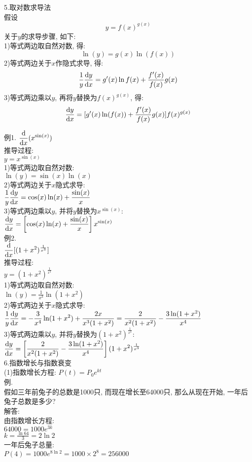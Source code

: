 5.取对数求导法\\
假设
\[y=f(x)^{g(x)}\]
关于$y$的求导步骤, 如下:\\
1)等式两边取自然对数, 得:
\[\ln(y)=g(x)\ln(f(x))\]
2)等式两边关于$x$作隐式求导, 得:
\[\frac{1}{y}\frac{\mathop{}\!\mathrm{d} y}{\mathop{}\!\mathrm{d} x}=g'(x)\ln f(x)+\frac{f'(x)}{f(x)}g(x)\]
3)等式两边乘以$y$, 再将$y$替换为$f(x)^{g(x)}$, 得:
\[\frac{\mathop{}\!\mathrm{d} y}{\mathop{}\!\mathrm{d} x}=[g'(x)\ln(f(x))+\frac{f'(x)}{f(x)}g(x)]f(x)^{g(x)}\]

例1.
\phantom{例}$\displaystyle\frac{\mathop{}\!\mathrm{d}}{\mathop{}\!\mathrm{d} x}(x^{\sin(x)})$\\
推导过程:\\
$\displaystyle y=x^{\sin(x)}$\\
1)等式两边取自然对数:\\
\phantom{\qquad}$\displaystyle\ln(y)=\sin(x)\ln(x)$\\
2)等式两边关于$x$隐式求导:\\
\phantom{\qquad}$\displaystyle\frac{1}{y}\frac{\mathop{}\!\mathrm{d} y}{\mathop{}\!\mathrm{d} x}=\cos(x)\ln(x)+\frac{\sin(x)}{x}$\\
3)等式两边乘以$y$, 并将$y$替换为$x^{\sin(x)}$:\\
\phantom{\qquad}$\displaystyle\frac{\mathop{}\!\mathrm{d} y}{\mathop{}\!\mathrm{d} x}=\left[\cos(x)\ln(x)+\frac{\sin(x)}{x}\right]x^{\sin(x)}$\\[1ex]

例2.\\
\phantom{例}$\displaystyle\frac{\mathop{}\!\mathrm{d}}{\mathop{}\!\mathrm{d} x}[(1+x^2)^{\frac{1}{x^3}}]$\\
推导过程:\\
$\displaystyle y=(1+x^2)^{\frac{1}{x^3}}$\\
1)等式两边取自然对数:\\
\phantom{\qquad}$\displaystyle\ln(y)=\frac{1}{x^3}\ln(1+x^2)$\\
2)等式两边关于$x$隐式求导:\\
\phantom{\qquad}$\displaystyle\frac{1}{y}\frac{\mathop{}\!\mathrm{d} y}{\mathop{}\!\mathrm{d} x}=-\frac{3}{x^4}\ln(1+x^2)+\frac{2x}{x^3(1+x^2)}=\frac{2}{x^2(1+x^2)}-\frac{3\ln(1+x^2)}{x^4}$\\
3)等式两边乘以$y$, 并将$y$替换为$(1+x^2)^{\frac{1}{x^3}}$:\\
\phantom{\qquad}$\displaystyle\frac{\mathop{}\!\mathrm{d} y}{\mathop{}\!\mathrm{d} x}=\left[\frac{2}{x^2(1+x^2)}-\frac{3\ln(1+x^2)}{x^4}\right](1+x^2)^{\frac{1}{x^3}}$\\[2ex]

6.指数增长与指数衰变\\
(1)指数增长方程: $\displaystyle P(t)=P_0e^{kt}$\\
例.\\
\phantom{空格}假如三年前兔子的总数是1000只, 而现在增长至64000只, 那么从现在开始, 一年后兔子总数是多少?\\
解答:\\
由指数增长方程:\\
\phantom{\qquad}$\displaystyle 64000=1000e^{3k}$\\
\phantom{\qquad}$\displaystyle k=\frac{\ln64}{3}=2\ln2$\\
一年后兔子总量:\\
$\displaystyle P(4)=1000e^{8\ln2}=1000\times2^8=256000$\\[1ex]

